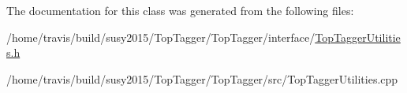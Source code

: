 The documentation for this class was generated from the following files\-:\begin{DoxyCompactItemize}
\item 
/home/travis/build/susy2015/\-Top\-Tagger/\-Top\-Tagger/interface/\hyperlink{TopTaggerUtilities_8h}{Top\-Tagger\-Utilities.\-h}\item 
/home/travis/build/susy2015/\-Top\-Tagger/\-Top\-Tagger/src/Top\-Tagger\-Utilities.\-cpp\end{DoxyCompactItemize}
